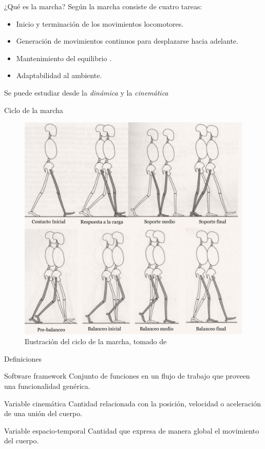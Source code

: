 \documentclass{beamer} %
\begin{document}
\begin{frame}{¿Qué es la marcha?}
    Según \citep{menz} la marcha consiste de cuatro tareas:
    \begin{itemize}
        \item Inicio y terminación de los movimientos locomotores.
        \item Generación de movimientos continuos para desplazarse hacia adelante.
        \item Mantenimiento del equilibrio .
        \item Adaptabilidad al ambiente. 
    \end{itemize}
    Se puede estudiar desde la \emph{dinámica} y la \emph{cinemática}
\end{frame}

\begin{frame}{Ciclo de la marcha}
    \begin{figure}
        \centering
        \includegraphics[height=0.7\textheight]{../report/imagenes/ciclo_marcha}
        \caption{Ilustración del ciclo de la marcha, tomado de \citep{perry}}
    \end{figure}
\end{frame}


\begin{frame}{Definiciones}
    \begin{block}{Software framework}
        Conjunto de funciones en un flujo de trabajo que proveen una funcionalidad genérica. 
    \end{block}
    \begin{block}{Variable cinemática}
        Cantidad relacionada con la posición, velocidad o aceleración de una unión del cuerpo.
    \end{block}
    \begin{block}{Variable espacio-temporal}
        Cantidad que expresa de manera global el movimiento del cuerpo.
    \end{block}
\end{frame}
\end{document}
